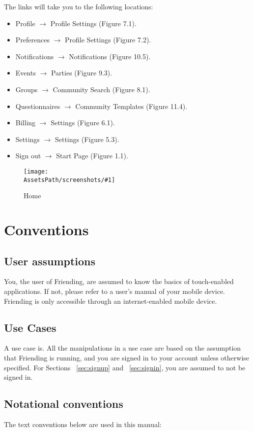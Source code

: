 \documentclass[a4paper,11pt,titlepage]{scrartcl}
\newcommand{\textapp}[1]{{\fontfamily{cmss}\selectfont#1}}
\newcommand{\Friending}{\textapp{Friending}}
\newcommand*{\fileHomepage}{homepage}
\newcommand*{\AssetsPath}{../assets}%
\newcommand{\appscreenshot}[3]{
	\begin{figure}[ht!]%
	\label{#3}%
	\texttt{[image: \\AssetsPath/screenshots/\#1]}%
	\centering%
	\caption{#2}%
	\end{figure}%
}
\begin{document}
The links will take you to the following locations:

\begin{itemize}
\item Profile $\rightarrow$ Profile Settings (Figure 7.1).
\item Preferences $\rightarrow$ Profile Settings (Figure 7.2).
\item Notifications $\rightarrow$ Notifications (Figure 10.5).
\item Events $\rightarrow$ Parties (Figure 9.3).
\item Groups $\rightarrow$ Community Search (Figure 8.1).
\item Questionnaires $\rightarrow$ Community Templates (Figure 11.4).
\item Billing $\rightarrow$ Settings (Figure 6.1).
\item Settings $\rightarrow$ Settings (Figure 5.3).
\item Sign out $\rightarrow$ Start Page (Figure 1.1).
\end{itemize}

\appscreenshot{\fileHomepage}{Home}{fig:home}

\clearpage
\section{Conventions}
\label{sec:conventions}

\subsection{User assumptions}
\label{sec:assumptions}
You, the user of \Friending{}, are assumed to know the basics of touch-enabled applications.  If not, please refer to a user’s manual of your mobile device.  \Friending{} is only accessible through an internet-enabled mobile device.

\subsection{Use Cases}
\label{sec:usecases}
A use case is.  All the manipulations in a use case are based on the assumption that \Friending{} is running, and you are signed in to your account unless otherwise specified.  For Sections ~\ref{sec:signup} and ~\ref{sec:signin}, you are assumed to not be signed in.  

\subsection{Notational conventions}
\label{sec:notational}
The text conventions below are used in this manual:
\end{document}

